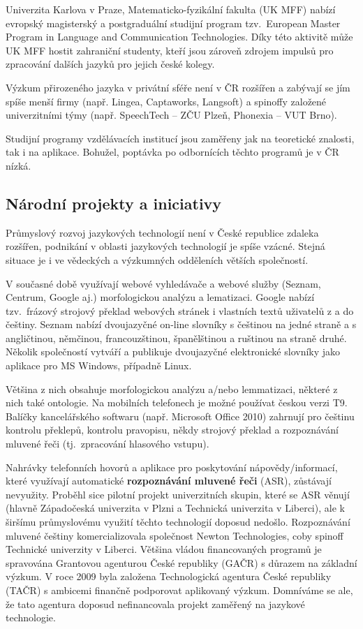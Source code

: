\begin{multicols}{2}
Univerzita Karlova v Praze, Matematicko-fyzikální fakulta (UK MFF) nabízí evropský magisterský a postgraduální studijní program tzv.~European Master Program in Language and Communication Technologies. Díky této aktivitě může UK MFF hostit zahraniční studenty, kteří jsou zároveň zdrojem impulsů pro zpracování dalších jazyků pro jejich české kolegy.

Výzkum přirozeného jazyka v privátní sféře není v ČR rozšířen a zabývají se jím spíše menší firmy (např. Lingea, Captaworks, Langsoft) a spinoffy založené univerzitními týmy (např. SpeechTech -- ZČU Plzeň, Phonexia – VUT Brno).

Studijní programy vzdělávacích institucí jsou zaměřeny jak na teoretické znalosti, tak i na aplikace. Bohužel, poptávka po odbornících těchto programů je v ČR nízká.

\subsection{Národní projekty a iniciativy}
Průmyslový rozvoj jazykových technologií není v České republice zdaleka rozšířen, podnikání v oblasti jazykových technologií je spíše vzácné. Stejná situace je i ve vědeckých a výzkumných odděleních větších společností.

V současné době využívají webové vyhledávače a webové služby (Seznam, Centrum, Google aj.) morfologickou analýzu a lematizaci. Google nabízí tzv.~frázový strojový překlad webových stránek i vlastních textů uživatelů z a do češtiny. Seznam nabízí dvoujazyčné on-line slovníky s češtinou na jedné straně a s angličtinou, němčinou, francouzštinou, španělštinou a ruštinou na straně druhé. Několik společností vytváří a publikuje dvoujazyčné elektronické slovníky jako aplikace pro MS Windows, případně Linux.

Většina z nich obsahuje morfologickou analýzu a/nebo lemmatizaci, některé z nich také ontologie. Na mobilních telefonech je možné používat českou verzi T9. Balíčky kancelářského softwaru (např. Microsoft Office 2010) zahrnují pro češtinu kontrolu překlepů, kontrolu pravopisu, někdy strojový překlad a rozpoznávání mluvené řeči (tj.~zpracování hlasového vstupu).

Nahrávky telefonních hovorů a aplikace pro poskytování nápovědy/informací, které využívají automatické \textbf{rozpoznávání mluvené řeči} (ASR), zůstávají nevyužity. Proběhl sice pilotní projekt univerzitních skupin, které se ASR věnují (hlavně Západočeská univerzita v Plzni a Technická univerzita v Liberci), ale k širšímu průmyslovému využití těchto technologií doposud nedošlo.
Rozpoznávání mluvené češtiny komercializovala společnost Newton Technologies, coby spinoff Technické univerzity v Liberci. Většina vládou financovaných programů je spravována Grantovou agenturou České republiky (GAČR) s důrazem na základní výzkum. V roce 2009 byla založena Technologická agentura České republiky (TAČR) s ambicemi finančně podporovat aplikovaný výzkum. Domníváme se ale, že tato agentura doposud nefinancovala projekt zaměřený na jazykové technologie.


\end{multicols}
